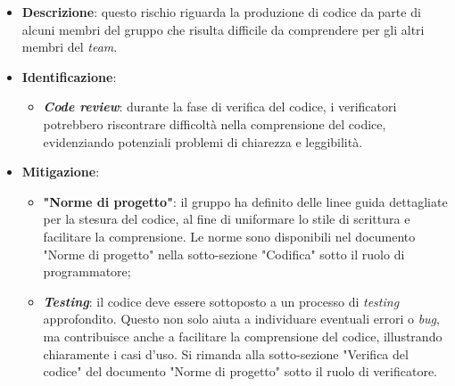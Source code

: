 \label{risk:codice incomprensibile}
\begin{itemize}
	\item \textbf{Descrizione}: questo rischio riguarda la produzione di codice
	      da parte di alcuni membri del gruppo che risulta
	      difficile da comprendere per gli altri membri del \textit{team}.
	\item \textbf{Identificazione}:
	      \begin{itemize}
		      \item \textbf{\textit{Code review}}: durante la fase di verifica del codice,
		            i verificatori potrebbero riscontrare difficoltà
		            nella comprensione del codice, evidenziando
		            potenziali problemi di chiarezza e leggibilità.
	      \end{itemize}

	\item \textbf{Mitigazione}:
	      \begin{itemize}
		      \item \textbf{"Norme di progetto"}: il gruppo ha definito delle linee guida dettagliate
		            per la stesura del codice, al fine di uniformare lo stile di scrittura e facilitare
		            la comprensione. Le norme sono disponibili nel documento "Norme di progetto"
		            nella sotto-sezione "Codifica" sotto il ruolo di programmatore;

		      \item \textbf{\textit{Testing}}: il codice deve essere sottoposto a un processo di
		            \textit{testing} approfondito. Questo non solo aiuta a individuare eventuali errori o \textit{bug},
		            ma contribuisce anche a facilitare la comprensione del codice, illustrando
		            chiaramente i casi d'uso. Si rimanda alla sotto-sezione "Verifica del codice"
		            del documento "Norme di progetto" sotto il ruolo di verificatore.
	      \end{itemize}
\end{itemize}
